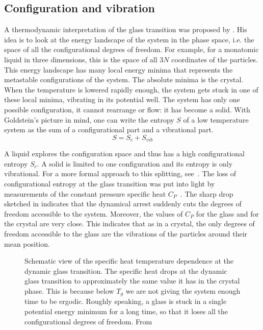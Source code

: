 \subsection{Configuration and vibration}
\label{sec:config_vib}

A thermodynamic interpretation of the glass transition was proposed by \citet{Goldstein1969}. His idea is to look at the energy landscape of the system in the phase space, i.e. the space of all the configurational degrees of freedom. For example, for a monatomic liquid in three dimensions, this is the space of all $3 N$ coordinates of the particles. This energy landscape has many local energy minima that represents the metastable configurations of the system. The absolute minima is the crystal. When the temperature is lowered rapidly enough, the system gets stuck in one of these local minima, vibrating in its potential well. The system has only one possible configuration, it cannot rearrange or flow: it has become a solid. With Goldstein's picture in mind, one can write the entropy $S$ of a low temperature system as the sum of a configurational part and a vibrational part.
\begin{equation}
	S = S_c + S_{vib}
	\label{eq:config_vib}
\end{equation}

A liquid explores the configuration space and thus has a high configurational entropy $S_c$. A solid is limited to one configuration and its entropy is only vibrational. For a more formal approach to this splitting, see~\citep{Scheidler2001, Nielsen1999}. The loss of configurational entropy at the glass transition was put into light by measurements of the constant pressure specific heat $C_P$~\citep{ANGELL1988}. The sharp drop sketched in  indicates that the dynamical arrest suddenly cuts the degrees of freedom accessible to the system. Moreover, the values of $C_P$ for the glass and for the crystal are very close. This indicates that as in a crystal, the only degrees of freedom accessible to the glass are the vibrations of the particles around their mean position.

\begin{figure}
	\centering
	\def\svgwidth{0.8\textwidth}
   	
	\caption{Schematic view of the specific heat temperature dependence at the dynamic glass transition. The specific heat drops at the dynamic glass transition to approximately the same value it has in the crystal phase. This is because below $T_g$ we are not giving the system enough time to be ergodic. Roughly speaking, a glass is stuck in a single potential energy minimum for a long time, so that it loses all the configurational degrees of freedom. From }
	\label{fig:specific_heat}
\end{figure}


